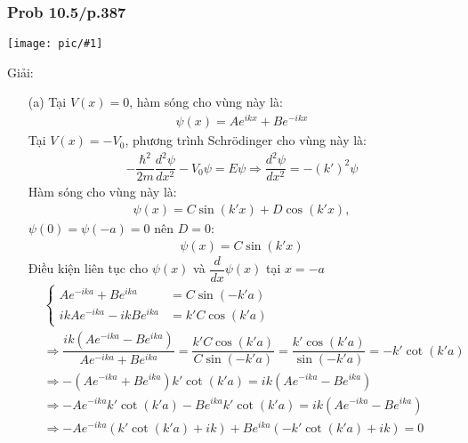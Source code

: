 \documentclass{report}
\newcommand{\image}[1]{
	\begin{center}
		\texttt{[image: pic/\#1]}
	\end{center}
}
\newcommand{\f}[2]{\dfrac{#1}{#2}}
\begin{document}
\subsubsection{Prob 10.5/p.387}
\image{prob10_5.png}
Giải:\\

\begin{enumerate}
	\item[(a)]
		Tại $V(x) = 0$, hàm sóng cho vùng này là:
		\begin{align*}
			\psi(x) = A e^{ikx} + B e^{-ikx}
		\end{align*}
		Tại $V(x) = -V_0$, phương trình Schr\"{o}dinger cho vùng này là:
		\begin{align*}
			-\f{\hbar^2}{2m}\f{d^2\psi}{dx^2} - V_0 \psi = E\psi \Rightarrow \f{d^2\psi}{dx^2} = -(k')^2\psi
		\end{align*}
		Hàm sóng cho vùng này là:
		\begin{align*}
			\psi(x) = C \sin(k'x) + D\cos(k'x),
		\end{align*}
		$\psi (0) = \psi (-a) = 0$ nên $D = 0$:
		\begin{align*}
			\psi(x) = C \sin(k'x)
		\end{align*}
		Điều kiện liên tục cho $\psi(x)$ và $\f{d}{dx}\psi(x)$ tại $x= - a$
		\begin{align*}
			 & \begin{cases}
				   A e^{-ika} + B e^{ika}       & = C \sin(-k'a)   \\
				   ik A e^{-ika} - ik B e^{ika} & = k' C \cos(k'a)
			   \end{cases}                                                                                                             \\
			 & \Rightarrow \f{ik(A e^{-ika} - B e^{ika})}{A e^{-ika} + B e^{ika}} = \f{k' C \cos(k'a)}{C \sin(-k'a)} = \f{k' \cos(k'a)}{\sin(-k'a)} = -k' \cot(k'a)        \\
			 & \Rightarrow -(A e^{-ika} + B e^{ika}) k' \cot(k'a) = ik(A e^{-ika} - B e^{ika})                                                                             \\
			 & \Rightarrow -A e^{-ika}k' \cot(k'a) - B e^{ika}k' \cot(k'a)  = ik(A e^{-ika} - B e^{ika})                                                                   \\
			 & \Rightarrow -A e^{-ika}\left( k' \cot(k'a) + ik \right) + B e^{ika}( -k' \cot(k'a) + ik)  = 0                                                               \\

\end{align*}
\end{enumerate}
\end{document}
